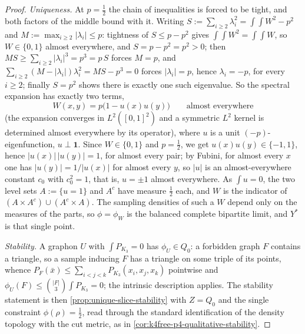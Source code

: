 \documentclass[11pt]{article}
\theoremstyle{definition}
\newcommand{\one}{\mathbf 1}
\begin{document}
\begin{proof}
\emph{Uniqueness.}
At $p=\frac12$ the chain of inequalities is forced to be tight, and both factors of
the middle bound with it.  Writing $S:=\sum_{i\ge2}\lambda_i^2=\int\!\!\int W^2-p^2$
and $M:=\max_{i\ge2}|\lambda_i|\le p$: tightness of $S\le p-p^2$ gives
$\int\!\!\int W^2=\int\!\!\int W$, so $W\in\{0,1\}$ almost everywhere, and
$S=p-p^2=p^2>0$; then $MS\ge\sum_{i\ge2}|\lambda_i|^3=p^3=p\,S$ forces $M=p$, and
$\sum_{i\ge2}(M-|\lambda_i|)\lambda_i^2=MS-p^3=0$ forces $|\lambda_i|=p$, hence
$\lambda_i=-p$, for every $i\ge2$; finally $S=p^2$ shows there is exactly one such
eigenvalue.  So the spectral expansion has exactly two terms,
\[
  W(x,y)=p\bigl(1-u(x)u(y)\bigr)
  \qquad\text{almost everywhere}
\]
(the expansion converges in $L^2([0,1]^2)$ and a symmetric $L^2$ kernel is determined
almost everywhere by its operator), where $u$ is a unit $(-p)$-eigenfunction,
$u\perp\one$.  Since $W\in\{0,1\}$ and $p=\frac12$, we get
$u(x)u(y)\in\{-1,1\}$, hence $|u(x)|\,|u(y)|=1$, for almost every pair; by Fubini,
for almost every $x$ one has $|u(y)|=1/|u(x)|$ for almost every $y$, so $|u|$ is an
almost-everywhere constant $c_0$ with $c_0^2=1$, that is, $u=\pm1$ almost everywhere.
As $\int u=0$, the two level sets $A:=\{u=1\}$ and $A^c$ have measure $\frac12$ each,
and $W$ is the indicator of $(A\times A^c)\cup(A^c\times A)$.  The sampling densities
of such a $W$ depend only on the measures of the parts, so $\phi=\phi_W$ is the
balanced complete bipartite limit, and $Y^\ast$ is that single point.

\emph{Stability.}
A graphon $U$ with $\int P_{K_3}=0$ has $\phi_U\in Q_0$: a forbidden graph $F$
contains a triangle, so a sample inducing $F$ has a triangle on some triple of its
points, whence
$P_F(\bar x)\le\sum_{i<j<k}P_{K_3}(x_i,x_j,x_k)$ pointwise and
$\phi_U(F)\le\binom{|F|}3\int P_{K_3}=0$; the intrinsic description applies.  The stability statement is then \cref{prop:unique-slice-stability} with
$Z=Q_0$ and the single constraint $\phi(\rho)=\frac12$, read through the standard
identification of the density topology with the cut metric, as in
\cref{cor:k4free-p4-qualitative-stability}.
\end{proof}
\end{document}

